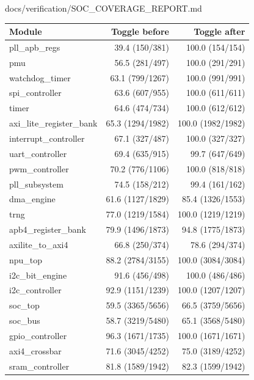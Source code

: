 \begin{relocated}{docs/verification/SOC_COVERAGE_REPORT.md}
{
\begin{longtable}[]{@{}lrr@{}}
\toprule\noalign{}
Module & Toggle before & Toggle after \\
\midrule\noalign{}
\endhead
\bottomrule\noalign{}
\endlastfoot
pll\_\allowbreak{}apb\_\allowbreak{}regs & 39.4 (150/381) & 100.0
(154/154) \\
pmu & 56.5 (281/497) & 100.0 (291/291) \\
watchdog\_\allowbreak{}timer & 63.1 (799/\allowbreak{}1267) & 100.0
(991/991) \\
spi\_\allowbreak{}controller & 63.6 (607/955) & 100.0 (611/611) \\
timer & 64.6 (474/734) & 100.0 (612/612) \\
axi\_\allowbreak{}lite\_\allowbreak{}register\_\allowbreak{}bank & 65.3
(1294/\allowbreak{}1982) & 100.0 (1982/\allowbreak{}1982) \\
interrupt\_\allowbreak{}controller & 67.1 (327/487) & 100.0 (327/327) \\
uart\_\allowbreak{}controller & 69.4 (635/915) & 99.7 (647/649) \\
pwm\_\allowbreak{}controller & 70.2 (776/\allowbreak{}1106) & 100.0
(818/818) \\
pll\_\allowbreak{}subsystem & 74.5 (158/212) & 99.4 (161/162) \\
dma\_\allowbreak{}engine & 61.6 (1127/\allowbreak{}1829) & 85.4
(1326/\allowbreak{}1553) \\
trng & 77.0 (1219/\allowbreak{}1584) & 100.0 (1219/\allowbreak{}1219) \\
apb4\_\allowbreak{}register\_\allowbreak{}bank & 79.9
(1496/\allowbreak{}1873) & 94.8 (1775/\allowbreak{}1873) \\
axilite\_\allowbreak{}to\_\allowbreak{}axi4 & 66.8 (250/374) & 78.6
(294/374) \\
npu\_top & 88.2 (2784/\allowbreak{}3155) & 100.0
(3084/\allowbreak{}3084) \\
i2c\_\allowbreak{}bit\_\allowbreak{}engine & 91.6 (456/498) & 100.0
(486/486) \\
i2c\_\allowbreak{}controller & 92.9 (1151/\allowbreak{}1239) & 100.0
(1207/\allowbreak{}1207) \\
soc\_top & 59.5 (3365/\allowbreak{}5656) & 66.5
(3759/\allowbreak{}5656) \\
soc\_bus & 58.7 (3219/\allowbreak{}5480) & 65.1
(3568/\allowbreak{}5480) \\
gpio\_\allowbreak{}controller & 96.3 (1671/\allowbreak{}1735) & 100.0
(1671/\allowbreak{}1671) \\
axi4\_\allowbreak{}crossbar & 71.6 (3045/\allowbreak{}4252) & 75.0
(3189/\allowbreak{}4252) \\
sram\_\allowbreak{}controller & 81.8 (1589/\allowbreak{}1942) & 82.3
(1599/\allowbreak{}1942) \\
\end{longtable}
}


\end{relocated}
